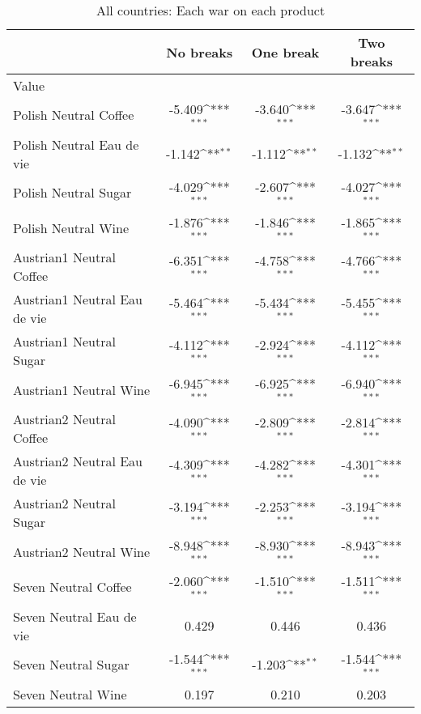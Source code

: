 \begin{table}[htbp]\centering
\def\sym#1{\ifmmode^{#1}\else\(^{#1}\)\fi}
\caption{All countries: Each war on each product\label{tab1}}
\begin{tabular}{l*{3}{c}}
\hline\hline
                    &\multicolumn{1}{c}{No breaks}&\multicolumn{1}{c}{One break}&\multicolumn{1}{c}{Two breaks}\\
\hline
Value               &                     &                     &                     \\
Polish Neutral Coffee&      -5.409\sym{***}&      -3.640\sym{***}&      -3.647\sym{***}\\
Polish Neutral Eau de vie&      -1.142\sym{**} &      -1.112\sym{**} &      -1.132\sym{**} \\
Polish Neutral Sugar&      -4.029\sym{***}&      -2.607\sym{***}&      -4.027\sym{***}\\
Polish Neutral Wine &      -1.876\sym{***}&      -1.846\sym{***}&      -1.865\sym{***}\\
Austrian1 Neutral Coffee&      -6.351\sym{***}&      -4.758\sym{***}&      -4.766\sym{***}\\
Austrian1 Neutral Eau de vie&      -5.464\sym{***}&      -5.434\sym{***}&      -5.455\sym{***}\\
Austrian1 Neutral Sugar&      -4.112\sym{***}&      -2.924\sym{***}&      -4.112\sym{***}\\
Austrian1 Neutral Wine&      -6.945\sym{***}&      -6.925\sym{***}&      -6.940\sym{***}\\
Austrian2 Neutral Coffee&      -4.090\sym{***}&      -2.809\sym{***}&      -2.814\sym{***}\\
Austrian2 Neutral Eau de vie&      -4.309\sym{***}&      -4.282\sym{***}&      -4.301\sym{***}\\
Austrian2 Neutral Sugar&      -3.194\sym{***}&      -2.253\sym{***}&      -3.194\sym{***}\\
Austrian2 Neutral Wine&      -8.948\sym{***}&      -8.930\sym{***}&      -8.943\sym{***}\\
Seven Neutral Coffee&      -2.060\sym{***}&      -1.510\sym{***}&      -1.511\sym{***}\\
Seven Neutral Eau de vie&       0.429         &       0.446         &       0.436         \\
Seven Neutral Sugar &      -1.544\sym{***}&      -1.203\sym{**} &      -1.544\sym{***}\\
Seven Neutral Wine  &       0.197         &       0.210         &       0.203         \\

\end{tabular}
\end{table}
